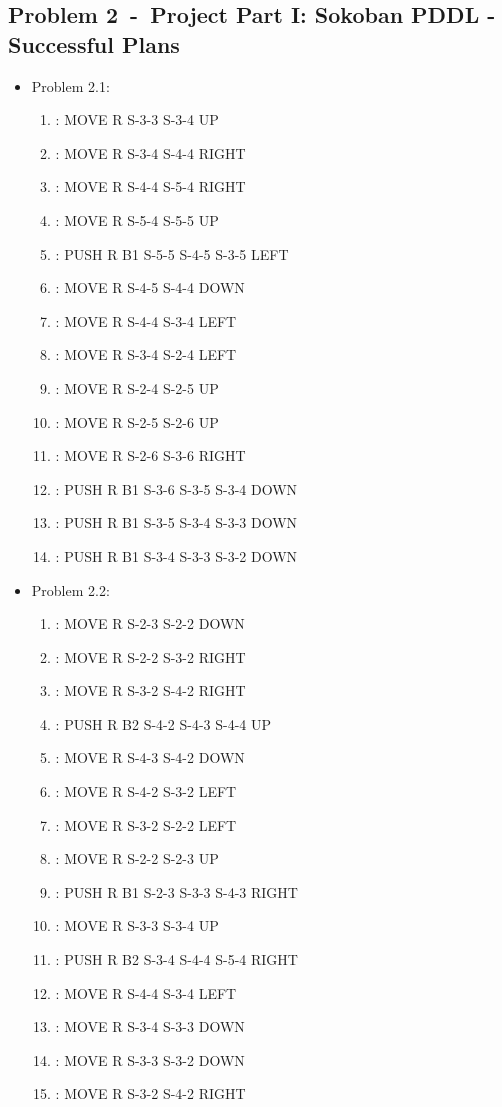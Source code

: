 \documentclass[12pt]{article}
\newcommand{\problem}[2]{\section*{Problem {#1}~-~{#2}}}
\begin{document}
\newpage
\begin{appendix}
\problem{2}{Project Part I: Sokoban PDDL - Successful Plans}
  \begin{itemize}
    \item Problem 2.1:
      \begin{enumerate}
	\item: MOVE R S-3-3 S-3-4 UP
	\item: MOVE R S-3-4 S-4-4 RIGHT
	\item: MOVE R S-4-4 S-5-4 RIGHT
	\item: MOVE R S-5-4 S-5-5 UP
	\item: PUSH R B1 S-5-5 S-4-5 S-3-5 LEFT
	\item: MOVE R S-4-5 S-4-4 DOWN
	\item: MOVE R S-4-4 S-3-4 LEFT
	\item: MOVE R S-3-4 S-2-4 LEFT
	\item: MOVE R S-2-4 S-2-5 UP
	\item: MOVE R S-2-5 S-2-6 UP
	\item : MOVE R S-2-6 S-3-6 RIGHT
	\item: PUSH R B1 S-3-6 S-3-5 S-3-4 DOWN
	\item: PUSH R B1 S-3-5 S-3-4 S-3-3 DOWN
	\item: PUSH R B1 S-3-4 S-3-3 S-3-2 DOWN
      \end{enumerate}
    \item Problem 2.2:
      \begin{enumerate}
	\item: MOVE R S-2-3 S-2-2 DOWN
	\item: MOVE R S-2-2 S-3-2 RIGHT
	\item: MOVE R S-3-2 S-4-2 RIGHT
	\item: PUSH R B2 S-4-2 S-4-3 S-4-4 UP
	\item: MOVE R S-4-3 S-4-2 DOWN
	\item: MOVE R S-4-2 S-3-2 LEFT
	\item: MOVE R S-3-2 S-2-2 LEFT
	\item: MOVE R S-2-2 S-2-3 UP
	\item: PUSH R B1 S-2-3 S-3-3 S-4-3 RIGHT
	\item: MOVE R S-3-3 S-3-4 UP
	\item: PUSH R B2 S-3-4 S-4-4 S-5-4 RIGHT
	\item: MOVE R S-4-4 S-3-4 LEFT
	\item: MOVE R S-3-4 S-3-3 DOWN
	\item: MOVE R S-3-3 S-3-2 DOWN
	\item: MOVE R S-3-2 S-4-2 RIGHT

\end{enumerate}
\end{itemize}
\end{appendix}
\end{document}
